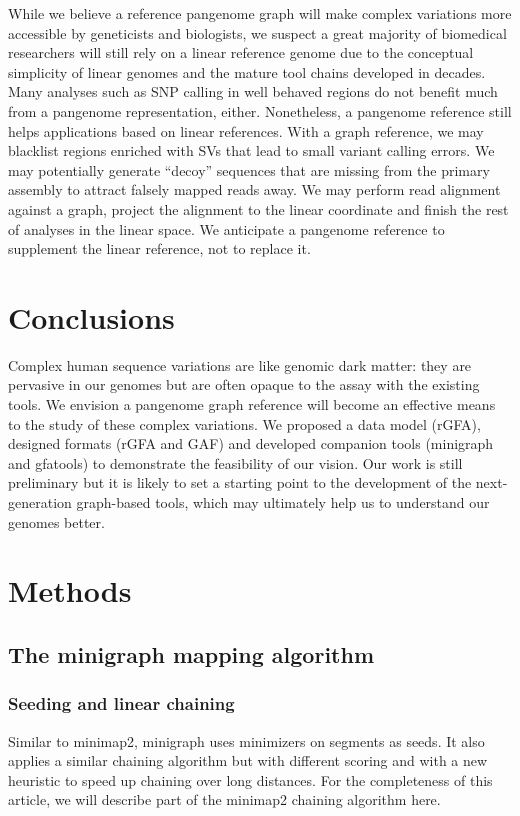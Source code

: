 \documentclass[twocolumn]{bmcart}
\begin{document}
While we believe a reference pangenome graph will make complex variations more
accessible by geneticists and biologists, we suspect a great majority of
biomedical researchers will still rely on a linear reference genome due to the
conceptual simplicity of linear genomes and the mature tool chains developed in
decades. Many analyses such as SNP calling in well behaved regions do not
benefit much from a pangenome representation, either. Nonetheless, a pangenome
reference still helps applications based on linear references. With a graph
reference, we may blacklist regions enriched with SVs that lead to small variant
calling errors.  We may potentially generate ``decoy'' sequences that are
missing from the primary assembly to attract falsely mapped reads away. We may
perform read alignment against a graph, project the alignment to the linear
coordinate and finish the rest of analyses in the linear space. We anticipate a
pangenome reference to supplement the linear reference, not to replace it.

\section*{Conclusions}

Complex human sequence variations are like genomic dark matter: they are
pervasive in our genomes but are often opaque to the assay with the existing
tools. We envision a pangenome graph reference will become an effective
means to the study of these complex variations. We proposed a data model (rGFA),
designed formats (rGFA and GAF) and developed companion tools (minigraph and
gfatools) to demonstrate the feasibility of our vision. Our work is still
preliminary but it is likely to set a starting point to the development of the
next-generation graph-based tools, which may ultimately help us to understand
our genomes better.

\section*{Methods}

\subsection*{The minigraph mapping algorithm}

\subsubsection*{Seeding and linear chaining}
Similar to minimap2, minigraph uses minimizers on segments as seeds. It also
applies a similar chaining algorithm but with different scoring and with a new
heuristic to speed up chaining over long distances. For the completeness of
this article, we will describe part of the minimap2 chaining algorithm here.
\end{document}
